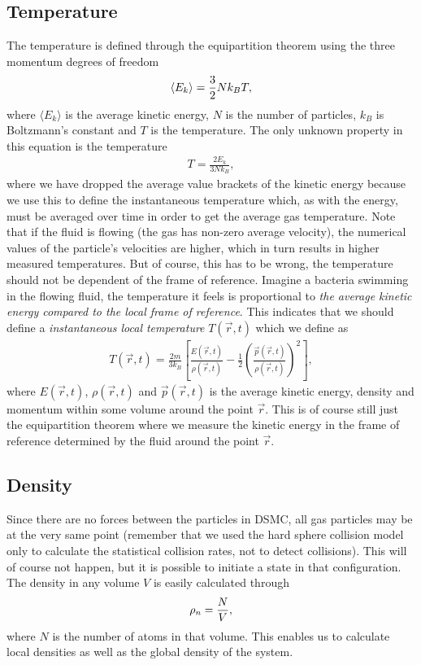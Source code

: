 \subsection{Temperature}
The temperature is defined through the equipartition theorem using the three momentum degrees of freedom
\begin{align}
	\langle E_k \rangle = {3\over 2}Nk_BT,
\end{align}
where $\langle E_k \rangle$ is the average kinetic energy, $N$ is the number of particles, $k_B$ is Boltzmann's constant and $T$ is the temperature. The only unknown property in this equation is the temperature
\begin{align}
	\label{eq:dsmc_temperature}
	T = \frac{2E_k}{3Nk_B},
\end{align}
where we have dropped the average value brackets of the kinetic energy because we use this to define the instantaneous temperature which, as with the energy, must be averaged over time in order to get the average gas temperature. Note that if the fluid is flowing (the gas has non-zero average velocity), the numerical values of the particle's velocities are higher, which in turn results in higher measured temperatures. But of course, this has to be wrong, the temperature should not be dependent of the frame of reference. Imagine a bacteria swimming in the flowing fluid, the temperature it feels is proportional to \textit{the average kinetic energy compared to the local frame of reference}. This indicates that we should define a \textit{instantaneous local temperature} $T(\vec r, t)$ which we define as
\begin{align}
	\label{eq:dsmc_local_temperature}
	T(\vec r, t) = \frac{2m}{3k_B}\left[\frac{E(\vec r, t)}{\rho(\vec r, t)} - \frac{1}{2}\left(\frac{\vec p(\vec r, t)}{\rho(\vec r, t)}\right)^2\right],
\end{align}
where $E(\vec r,t)$, $\rho(\vec r,t)$ and $\vec p(\vec r,t)$ is the average kinetic energy, density and momentum within some volume around the point $\vec r$. This is of course still just the equipartition theorem where we measure the kinetic energy in the frame of reference determined by the fluid around the point $\vec r$. 
\subsection{Density}
Since there are no forces between the particles in DSMC, all gas particles may be at the very same point (remember that we used the hard sphere collision model only to calculate the statistical collision rates, not to detect collisions). This will of course not happen, but it is possible to initiate a state in that configuration. The density in any volume $V$ is easily calculated through
\begin{align}
	\rho_n = {N \over V},
\end{align}
where $N$ is the number of atoms in that volume. This enables us to calculate local densities as well as the global density of the system.
